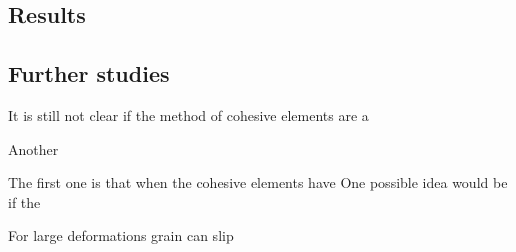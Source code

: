 \documentclass[conclusion.tex]{subfiles}
\begin{document}
\subsection{Results}


\subsection{Further studies}

It is still not clear if the method of cohesive elements are a 

Another 

The first one is that when the cohesive elements have 
One possible idea would be if the

For large deformations grain can slip
\end{document}
